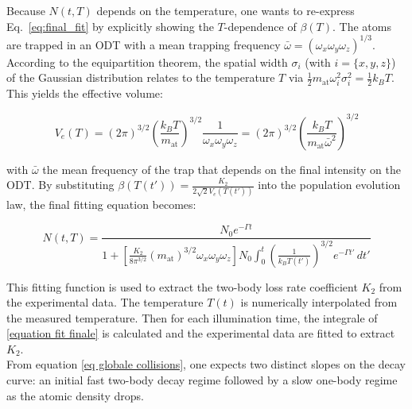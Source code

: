 Because $N(t,T)$ depends on the temperature, one wants to re-express Eq.~\ref{eq:final_fit} by explicitly showing the $T$-dependence of $\beta(T)$. The atoms are trapped in an ODT with a mean trapping frequency 
$\bar{\omega} = (\omega_x \omega_y \omega_z)^{1/3}$. According to the equipartition theorem, the spatial width $\sigma_{i}$ (with $i=\{x,y,z\}$) of the Gaussian distribution relates to the temperature $T$ via 
$\frac{1}{2}m_{\text{at}}\omega_{i}^2\sigma_{i}^2 = \frac{1}{2}k_B T$. This yields the effective volume:

\begin{equation}
    V_e(T) = (2\pi)^{3/2}\left(\frac{k_B T}{m_{\text{at}}}\right)^{3/2} \frac{1}{\omega_x\omega_y\omega_z} = (2\pi)^{3/2}\left(\frac{k_B T}{m_{\text{at}}\bar{\omega}^2}\right)^{3/2}
\end{equation}

with $\bar{\omega}$ the mean frequency of the trap that depends on the final intensity on the ODT. By substituting $\beta(T(t')) = \frac{K_2}{2\sqrt{2}V_e(T(t'))}$ into the population evolution law, the final fitting equation becomes:

\begin{equation}
    N(t,T) = \frac{N_0 e^{-\Gamma t}}{1 + \left[ \frac{K_2}{8\pi^{3/2}} \left( m_{\text{at}} \right)^{3/2} \omega_x\omega_y\omega_z \right] N_0 \int_{0}^{t} \left( \frac{1}{k_B T(t')} \right)^{3/2} e^{-\Gamma t'} \, dt'}
\label{equation fit finale}
\end{equation}

This fitting function is used to extract the two-body loss rate coefficient $K_2$ from the experimental data. The temperature $T(t)$ is numerically interpolated from the measured temperature. Then for each 
illumination time, the integrale of \ref{equation fit finale} is calculated and the experimental data are fitted to extract $K_2$.\\

From equation \ref{eq globale collisions}, one expects two distinct slopes on the decay curve: an initial fast two-body decay regime followed by a slow one-body regime as the atomic density drops.\\ 

